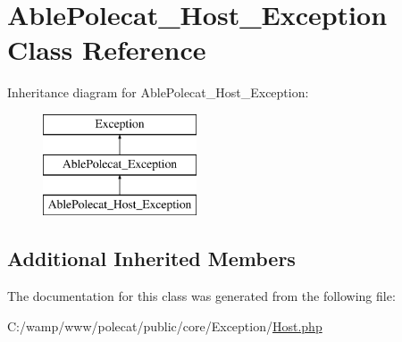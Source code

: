\hypertarget{class_able_polecat___host___exception}{}\section{Able\+Polecat\+\_\+\+Host\+\_\+\+Exception Class Reference}
\label{class_able_polecat___host___exception}
Inheritance diagram for Able\+Polecat\+\_\+\+Host\+\_\+\+Exception\+:\begin{figure}[H]
\begin{center}
\leavevmode
\includegraphics[height=3.000000cm]{class_able_polecat___host___exception}
\end{center}
\end{figure}
\subsection*{Additional Inherited Members}


The documentation for this class was generated from the following file\+:\begin{DoxyCompactItemize}
\item 
C\+:/wamp/www/polecat/public/core/\+Exception/\hyperlink{_exception_2_host_8php}{Host.\+php}\end{DoxyCompactItemize}
